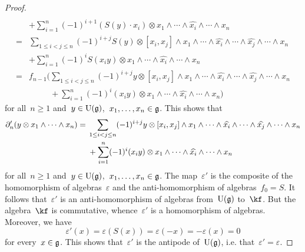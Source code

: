 \begin{proof}
\begin{align*}
		\\
		{}&
		+
		\sum_{i=1}^n
		(-1)^{i+1}
		( S(y) \cdot x_i )
		\otimes
		x_1 \wedge \dotsb \wedge \widehat{x_i} \wedge \dotsb \wedge x_n
		\\
		={}&
		\sum_{1 \leq i < j \leq n}
		(-1)^{i+j}
		S(y) \otimes
		[x_i, x_j] \wedge
		x_1 \wedge \dotsb \wedge \widehat{x_i} \wedge \dotsb \wedge \widehat{x_j} \wedge \dotsb \wedge x_n
		\\
		{}&
		+
		\sum_{i=1}^n
		(-1)^i
		S(x_i y)
		\otimes
		x_1 \wedge \dotsb \wedge \widehat{x_i} \wedge \dotsb \wedge x_n
		\\
		={}&
		f_{n-1}
		\Biggl(
			\sum_{1 \leq i < j \leq n}
			(-1)^{i+j}
			y \otimes
			[x_i, x_j] \wedge
			x_1 \wedge \dotsb \wedge \widehat{x_i} \wedge \dotsb \wedge \widehat{x_j} \wedge \dotsb \wedge x_n
		\\
			{}&
			\phantom{ f_{n-1} \Biggl( }
			+
			\sum_{i=1}^n
			(-1)^i
			(x_i y)
			\otimes
			x_1 \wedge \dotsb \wedge \widehat{x_i} \wedge \dotsb \wedge x_n
		\Biggr)
	\end{align*}
	for all~$n \geq 1$ and~$y \in \operatorname{U}(\mathfrak{g})$,~$x_1, \dotsc, x_n \in \mathfrak{g}$.
	This shows that
	\begin{align*}
		\partial'_n( y \otimes x_1 \wedge \dotsb \wedge x_n )
		={}&
		\sum_{1 \leq i < j \leq n}
		(-1)^{i+j}
		y \otimes
		[x_i, x_j] \wedge
		x_1 \wedge \dotsb \wedge \widehat{x_i} \wedge \dotsb \wedge \widehat{x_j} \wedge \dotsb \wedge x_n
		\\
		{}&
		+
		\sum_{i=1}^n
		(-1)^i
		(x_i y)
		\otimes
		x_1 \wedge \dotsb \wedge \widehat{x_i} \wedge \dotsb \wedge x_n
	\end{align*}
	for all~$n \geq 1$ and~$y \in \operatorname{U}(\mathfrak{g})$,~$x_1, \dotsc, x_n \in \mathfrak{g}$.
	The map~$\varepsilon'$ is the composite of the homomorphism of algebras~$\varepsilon$ and the anti-homomorphism of algebras~$f_0 = S$.
	It follows that~$\varepsilon'$ is an anti-homomorphism of algebras from~$\operatorname{U}(\mathfrak{g})$ to~$\kf$.
	But the algebra~$\kf$ is commutative, whence~$\varepsilon'$ is a homomorphism of algebras.
	Moreover, we have
	\[
		\varepsilon'(x)
		=
		\varepsilon( S(x) )
		=
		\varepsilon( -x )
		=
		- \varepsilon(x)
		=
		0
	\]
	for every~$x \in \mathfrak{g}$.
	This shows that~$\varepsilon'$ is the antipode of~$\operatorname{U}(\mathfrak{g})$, i.e. that~$\varepsilon' = \varepsilon$.
	

\end{proof}
